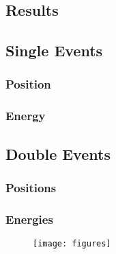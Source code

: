 \subsection{Results}
\subsection{Single Events}
\subsubsection{Position}
\subsubsection{Energy}
\subsection{Double Events}
\subsubsection{Positions}
\subsubsection{Energies}
\begin{figure}
    \texttt{[image: figures]}
    \caption{}
    \label{}
\end{figure}
